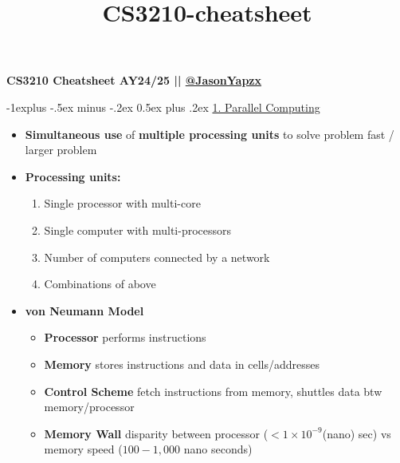 \documentclass[10pt,landscape]{article}
\title{CS3210-cheatsheet}
\makeatletter
\renewcommand{\subsection}{\@startsection{subsection}{2}{0mm}%
                                {-1explus -.5ex minus -.2ex}%
                                {0.5ex plus .2ex}%
                                {\normalfont\normalsize\bfseries}}
\makeatother
\begin{document}
\raggedright
\scriptsize


\begin{multicols*}{3}
\setlength{\premulticols}{0.1pt}
\setlength{\postmulticols}{0.1pt}
\setlength{\multicolsep}{0.1pt}
\setlength{\columnsep}{0.1pt}
\begin{tiny}
    \small{\textbf{CS3210 Cheatsheet AY24/25 || \href{https://github.com/JasonYapzx}{@JasonYapzx}}} \\
\end{tiny}


\subsection{\underline{1. Parallel Computing}}
\begin{itemize}[topsep=0pt,noitemsep,wide=0pt, leftmargin=\dimexpr{} + 2\relax]
    \item \textbf{Simultaneous use} of \textbf{multiple processing units} to solve problem fast / larger problem
    \item \textbf{Processing units:}
    \begin{enumerate}[topsep=0pt,noitemsep,wide=0pt, leftmargin=\dimexpr\labelwidth + 2\labelsep\relax]
        \item Single processor with multi-core
        \item Single computer with multi-processors
        \item Number of computers connected by a network
        \item Combinations of above
    \end{enumerate}
    \item \textbf{von Neumann Model}
    \begin{itemize}[topsep=0pt,noitemsep,wide=0pt, leftmargin=\dimexpr{} + 2\relax]
        \item \textbf{Processor} performs instructions
        \item \textbf{Memory} stores instructions and data in cells/addresses
        \item \textbf{Control Scheme} fetch instructions from memory, shuttles data btw memory/processor
        \item \textbf{Memory Wall} disparity between processor ($< 1\times 10^{-9}$(nano) sec) vs memory speed ($100-1,000$ nano seconds) 
    \end{itemize}
\end{itemize}


\end{multicols*}
\end{document}
